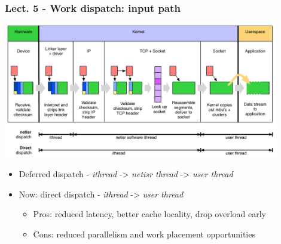 \begin{frame}
  \frametitle{Lect. 5 - Work dispatch: input path}

  \begin{center}
    \includegraphics[width=0.9\textwidth]{../../figures/network-dispatch-input.pdf}
  \end{center}

  \begin{small}
  \begin{itemize}
    \item Deferred dispatch - \textit{ithread} -> \textit{netisr thread} ->
      \textit{user thread}
    \item Now: direct dispatch - \textit{ithread} -> \textit{user thread}
    \begin{itemize}
      \item Pros: reduced latency, better cache locality, drop overload early
      \item Cons: reduced parallelism and work placement opportunities
    \end{itemize}
  \end{itemize}
  \end{small}
\end{frame}

